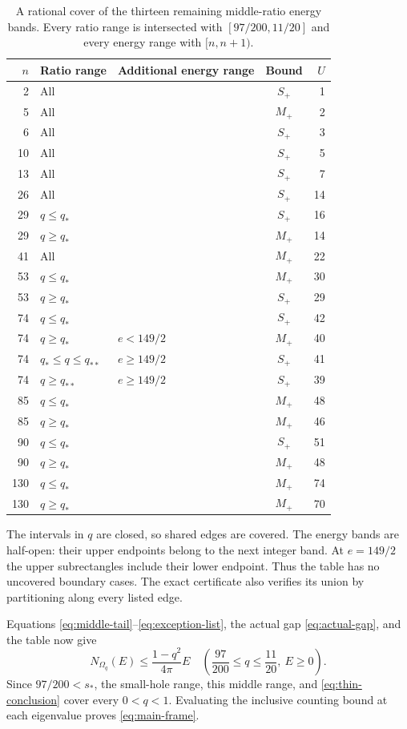 \documentclass[11pt,reqno]{amsart}
\numberwithin{equation}{section}
\newcommand{\Om}{\Omega}
\newcommand{\sstar}{s_*}
\begin{document}
\begin{table}[htbp]
\centering\small
\begin{tabular}{rllcr}
\toprule
$n$ & Ratio range & Additional energy range & Bound & $U$\\
\midrule
2 & All & & $S_+$ & 1\\
5 & All & & $M_+$ & 2\\
6 & All & & $S_+$ & 3\\
10 & All & & $S_+$ & 5\\
13 & All & & $S_+$ & 7\\
26 & All & & $S_+$ & 14\\
29 & $q\le q_*$ & & $S_+$ & 16\\
29 & $q\ge q_*$ & & $M_+$ & 14\\
41 & All & & $M_+$ & 22\\
53 & $q\le q_*$ & & $M_+$ & 30\\
53 & $q\ge q_*$ & & $S_+$ & 29\\
74 & $q\le q_*$ & & $S_+$ & 42\\
74 & $q\ge q_*$ & $e<149/2$ & $M_+$ & 40\\
74 & $q_*\le q\le q_{**}$ & $e\ge149/2$ & $S_+$ & 41\\
74 & $q\ge q_{**}$ & $e\ge149/2$ & $S_+$ & 39\\
85 & $q\le q_*$ & & $M_+$ & 48\\
85 & $q\ge q_*$ & & $M_+$ & 46\\
90 & $q\le q_*$ & & $S_+$ & 51\\
90 & $q\ge q_*$ & & $M_+$ & 48\\
130 & $q\le q_*$ & & $M_+$ & 74\\
130 & $q\ge q_*$ & & $M_+$ & 70\\
\bottomrule
\end{tabular}
\caption{A rational cover of the thirteen remaining middle-ratio
energy bands. Every ratio range is intersected with
$[97/200,11/20]$ and every energy range with $[n,n+1)$.}
\label{tab:middle-cover}
\end{table}

The intervals in $q$ are closed, so shared edges are covered.
The energy bands are half-open: their upper endpoints belong
to the next integer band. At $e=149/2$ the upper subrectangles
include their lower endpoint. Thus the table has no uncovered
boundary cases. The exact certificate also verifies its union
by partitioning along every listed edge.

Equations \eqref{eq:middle-tail}--\eqref{eq:exception-list},
the actual gap \eqref{eq:actual-gap}, and the table now give
\begin{equation}\label{eq:middle-conclusion}
 N_{\Om_q}(E)\le\frac{1-q^2}{4\pi}E
 \quad\left(\frac{97}{200}\le q\le\frac{11}{20},\ E\ge0\right).
\end{equation}
Since $97/200<\sstar$, the small-hole range, this middle
range, and \eqref{eq:thin-conclusion} cover every $0<q<1$.
Evaluating the inclusive counting bound at each eigenvalue
proves \eqref{eq:main-frame}.
\end{document}
